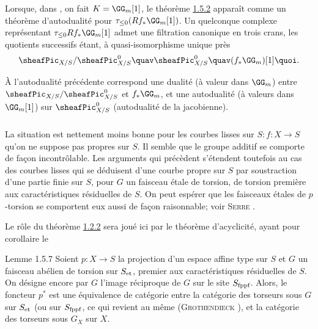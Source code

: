 \subsubsection{}
Lorsque, dans , on fait $K=\GG_{m}[1]$, le théorème
\hyperref[XVIII.thm1.5.2]{1.5.2} apparaît comme un théorème d'autodualité pour $\tau_{\leq
0}(Rf_{\ast}\GG_{m}[1])$. Un quelconque complexe représentant
$\tau_{\leq 0} Rf_{\ast} \GG_{m}[1]$ admet une filtration
canonique en trois crans, les quotients successifs étant, à
quasi-isomorphisme unique près
$$
\sheafPic_{X/S}/\sheafPic^{0}_{X/S}\quav \sheafPic^{0}_{X/S}\quav
(f_{\ast}\GG_{m})[1]{\quoi}.
$$

À l'autodualité précédente correspond une dualité (à valeur dans
$\GG_{m}$) entre $\sheafPic_{X/S}/\sheafPic^{0}_{X/S}$ et
$f_{\ast}\GG_{m}$, et une autodualité (à valeurs dans
$\GG_{m}[1]$) sur $\sheafPic^{0}_{X/S}$ (autodualité de la
jacobienne).

\subsubsection{}
La situation est nettement moins bonne pour les courbes lisses sur
$S:f:X\rightarrow S$ qu'on ne suppose pas propres sur $S$. Il semble
que le groupe additif se comporte de façon incontrôlable. Les
arguments qui précèdent s'étendent toutefois au cas des courbes lisses
qui se déduisent d'une courbe propre sur $S$ par soustraction d'une
partie finie sur $S$, pour $G$ un faisceau étale de torsion, de
torsion première aux caractéristiques résiduelles de $S$. On peut
espérer que les faisceaux étales de $p$-torsion se comportent eux
aussi de façon raisonnable; voir \textsc{Serre}
\cite[Ch.~VI nᵒ 11 p.~126]{6}.

Le rôle du théorème \hyperref[XVIII.thm1.2.2]{1.2.2} sera joué ici par le théorème
d'acyclicité\pageoriginale {}, ayant pour corollaire le

\begin{enonce*}{Lemme 1.5.7}
Soient $p:X\rightarrow S$ la projection d'un espace affine type sur
$S$ et $G$ un faisceau abélien de torsion sur $S_{\text{\rm et}}$,
premier aux caractéristiques résiduelles de $S$. On désigne encore par
$G$ l'image réciproque de $G$ sur le site $S_{\text{\rm
fppf}}$. Alors, le foncteur $p^{\ast}$ est une équivalence de
catégorie entre la catégorie des torseurs sous $G$ sur $S_{\text{\rm
et}}$ (ou sur $S_{\text{\rm fppf}}$, ce qui revient au même
{(\textsc{Grothendieck} \cite[Corollaire~11.9]{2})}, et la catégorie des torseurs sous $G_{X}$
sur $X$.
\end{enonce*}

